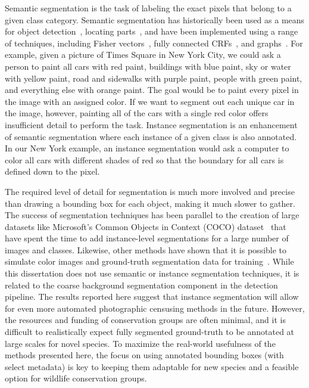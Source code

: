 Semantic segmentation is the task of labeling the exact pixels that belong to a given class category.  Semantic segmentation has historically been used as a means for object detection~\cite{yang_object_2014,pinheiro_learning_2015,hariharan_simultaneous_2014,fragkiadaki_learning_2015,hu_fastmask_2017}, locating parts~\cite{chai_symbiotic_2013}, and have been implemented using a range of techniques, including Fisher vectors~\cite{cinbis_segmentation_2013}, fully connected CRFs~\cite{chen_semantic_2014}, and graphs~\cite{felzenszwalb_efficient_2004}.  For example, given a picture of Times Square in New York City, we could ask a person to paint all cars with red paint, buildings with blue paint, sky or water with yellow paint, road and sidewalks with purple paint, people with green paint, and everything else with orange paint.  The goal would be to paint every pixel in the image with an assigned color.  If we want to segment out each unique car in the image, however, painting all of the cars with a single red color offers insufficient detail to perform the task.  Instance segmentation is an enhancement of semantic segmentation where each instance of a given class is also annotated. In our New York example, an instance segmentation would ask a computer to color all cars with different shades of red so that the boundary for all cars is defined down to the pixel.

The required level of detail for segmentation is much more involved and precise than drawing a bounding box for each object, making it much slower to gather.  The success of segmentation techniques has been parallel to the creation of large datasets like Microsoft's Common Objects in Context (COCO) dataset~\cite{lin_microsoft_2014} that have spent the time to add instance-level segmentations for a large number of images and classes.  Likewise, other methods have shown that it is possible to simulate color images and ground-truth segmentation data for training~\cite{dosovitskiy_carla:_2017,shah_airsim:_2017,qiu_unrealcv:_2016}.  While this dissertation does not use semantic or instance segmentation techniques, it is related to the coarse background segmentation component in the detection pipeline.  The results reported here suggest that instance segmentation will allow for even more automated photographic censusing methods in the future. However, the resources and funding of conservation groups are often minimal, and it is difficult to realistically expect fully segmented ground-truth to be annotated at large scales for novel species.  To maximize the real-world usefulness of the methods presented here, the focus on using annotated bounding boxes (with select metadata) is key to keeping them adaptable for new species and a feasible option for wildlife conservation groups.

